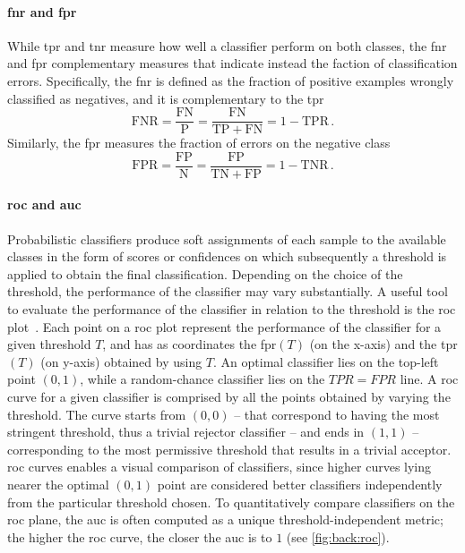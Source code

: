 \paragraph{\acrshort{fnr} and \acrshort{fpr}}
While \gls{tpr} and \gls{tnr} measure how well a classifier perform on both classes, the \gls{fnr} and \gls{fpr} complementary measures that indicate instead the faction of classification errors.
Specifically, the \gls{fnr} is defined as the fraction of positive examples wrongly classified as negatives, and it is complementary to the \gls{tpr}
\begin{equation} \label{eq:back:fnr}
    \mathrm{FNR} = \frac{\mathrm{FN}}{\mathrm{P}} = \frac{\mathrm{FN}}{\mathrm{TP} + \mathrm{FN}} = 1 - \mathrm{TPR}\,.
\end{equation}
Similarly, the \gls{fpr} measures the fraction of errors on the negative class
\begin{equation} \label{eq:back:fpr}
    \mathrm{FPR} = \frac{\mathrm{FP}}{\mathrm{N}} = \frac{\mathrm{FP}}{\mathrm{TN} + \mathrm{FP}} = 1 - \mathrm{TNR}\,.
\end{equation}

\paragraph{\acrshort{roc} and \acrshort{auc}}
Probabilistic classifiers produce soft assignments of each sample to the available classes in the form of scores or confidences on which subsequently a threshold is applied to obtain the final classification.
Depending on the choice of the threshold, the performance of the classifier may vary substantially.
A useful tool to evaluate the performance of the classifier in relation to the threshold is the \gls{roc} plot~\cite{fawcett2006introduction}.
Each point on a \gls{roc} plot represent the performance of the classifier for a given threshold $T$, and has as coordinates the \gls{fpr}$(T)$ (on the x-axis) and the \gls{tpr}$(T)$ (on y-axis) obtained by using $T$.
An optimal classifier lies on the top-left point $(0,1)$, while a random-chance classifier lies on the $TPR = FPR$ line.
A \gls{roc} curve for a given classifier is comprised by all the points obtained by varying the threshold.
The curve starts from $(0,0)$ -- that correspond to having the most stringent threshold, thus a trivial rejector classifier -- and ends in $(1,1)$ -- corresponding to the most permissive threshold that results in a trivial acceptor.
\Gls{roc} curves enables a visual comparison of classifiers, since higher curves lying nearer the optimal $(0,1)$ point are considered better classifiers independently from the particular threshold chosen.
To quantitatively compare classifiers on the \gls{roc} plane, the \gls{auc} is often computed as a unique threshold-independent metric;
the higher the \gls{roc} curve, the closer the \gls{auc} is to $1$ (see \ref{fig:back:roc}).

